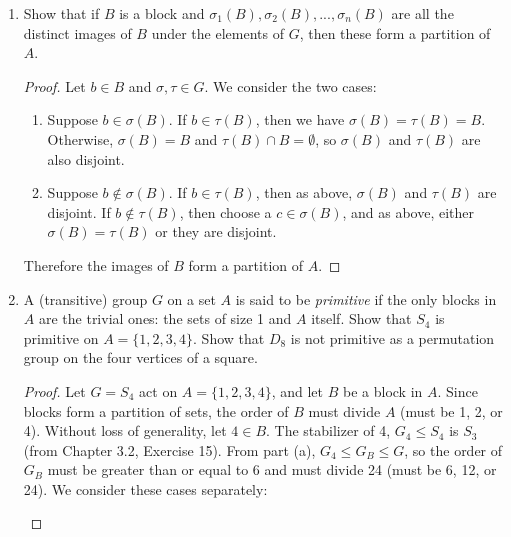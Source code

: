\documentclass{article}
\begin{document}
\begin{enumerate}[itemsep=0em, label=(\alph*)]
\begin{proof}
            Next, for some $a \in B$, let $\tau \in G_a$, so $\tau(a) = a$. Since $B$ is a block, either $\tau(B) = B$ or else $\tau(B) \cap B = \emptyset$. Now $a \in B$ and $\tau(a) = a$. Therefore $\tau(a)$ lies in $B$, so the intersection of $\tau(B)$ and $B$ is not empty, which implies that $\tau(B) = B$. Therefore $\tau \in G_B$, and so $G_a \subseteq G_B$; since they are both subgroups, we have $G_a \leq G_B$.
        \end{proof}
    \item Show that if $B$ is a block and $\sigma_1(B), \sigma_2(B), ..., \sigma_n(B)$ are all the distinct images of $B$ under the elements of $G$, then these form a partition of $A$.
        \begin{proof}
            Let $b \in B$ and $\sigma, \tau \in G$. We consider the two cases:
            \begin{enumerate}[itemsep=0em, label=(\roman*)]
                \item Suppose $b \in \sigma(B)$. If $b \in \tau(B)$, then we have $\sigma(B) = \tau(B) = B$. Otherwise, $\sigma(B) = B$ and $\tau(B) \cap B = \emptyset$, so $\sigma(B)$ and $\tau(B)$ are also disjoint.
                \item Suppose $b \notin \sigma(B)$. If $b \in \tau(B)$, then as above, $\sigma(B)$ and $\tau(B)$ are disjoint. If $b \notin \tau(B)$, then choose a $c \in \sigma(B)$, and as above, either $\sigma(B) = \tau(B)$ or they are disjoint.
            \end{enumerate}
            Therefore the images of $B$ form a partition of $A$.
        \end{proof}
    \item A (transitive) group $G$ on a set $A$ is said to be \emph{primitive} if the only blocks in $A$ are the trivial ones: the sets of size 1 and $A$ itself. Show that $S_4$ is primitive on $A = \{1, 2, 3, 4\}$. Show that $D_8$ is not primitive as a permutation group on the four vertices of a square.
    \begin{proof}
        Let $G = S_4$ act on $A = \{ 1, 2, 3, 4 \}$, and let $B$ be a block in $A$. Since blocks form a partition of sets, the order of $B$ must divide $A$ (must be 1, 2, or 4). Without loss of generality, let $4 \in B$. The stabilizer of 4, $G_4 \leq S_4$ is $S_3$ (from Chapter 3.2, Exercise 15). From part (a), $G_4 \leq G_B \leq G$, so the order of $G_B$ must be greater than or equal to 6 and must divide 24 (must be 6, 12, or 24). We consider these cases separately:
        \begin{enumerate}[itemsep=0em, label=(\roman*)]

\end{enumerate}
\end{proof}
\end{enumerate}
\end{document}
